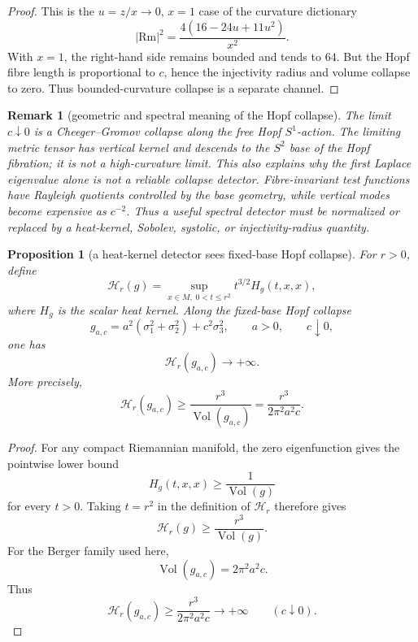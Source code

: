\documentclass[11pt]{amsart}
\newtheorem{proposition}{Proposition}
\newtheorem{remark}{Remark}
\newcommand{\Rm}{\mathrm{Rm}}
\newcommand{\Vol}{\operatorname{Vol}}
\begin{document}
\begin{proof}
This is the \(u=z/x\to0\), \(x=1\) case of the curvature dictionary
\[
        |\Rm|^2
        =
        \frac{4(16-24u+11u^2)}{x^2}.
\]
With \(x=1\), the right-hand side remains bounded and tends to \(64\).
But the Hopf fibre length is proportional to \(c\), hence the injectivity
radius and volume collapse to zero.  Thus bounded-curvature collapse is a
separate channel.
\end{proof}

\begin{remark}[geometric and spectral meaning of the Hopf collapse]\label{rem:hopf-quotient-spectrum}
The limit \(c\downarrow0\) is a Cheeger--Gromov collapse along the free Hopf
\(S^1\)-action.  The limiting metric tensor has vertical kernel and descends
to the \(S^2\) base of the Hopf fibration; it is not a high-curvature limit.
This also explains why the first Laplace eigenvalue alone is not a reliable
collapse detector.  Fibre-invariant test functions have Rayleigh quotients
controlled by the base geometry, while vertical modes become expensive as
\(c^{-2}\).  Thus a useful spectral detector must be normalized or replaced by
a heat-kernel, Sobolev, systolic, or injectivity-radius quantity.
\end{remark}


\begin{proposition}[a heat-kernel detector sees fixed-base Hopf collapse]\label{prop:heat-kernel-hopf}
For \(r>0\), define
\[
        \mathcal H_r(g)
        =
        \sup_{x\in M,\;0<t\le r^2} t^{3/2}H_g(t,x,x),
\]
where \(H_g\) is the scalar heat kernel.  Along the fixed-base Hopf collapse
\[
        g_{a,c}=a^2(\sigma_1^2+\sigma_2^2)+c^2\sigma_3^2,
        \qquad a>0,\qquad c\downarrow0,
\]
one has
\[
        \mathcal H_r(g_{a,c})\to+\infty .
\]
More precisely,
\[
        \mathcal H_r(g_{a,c})
        \ge
        \frac{r^3}{\Vol(g_{a,c})}
        =
        \frac{r^3}{2\pi^2a^2c}.
\]
\end{proposition}

\begin{proof}
For any compact Riemannian manifold, the zero eigenfunction gives the
pointwise lower bound
\[
        H_g(t,x,x)\ge \frac{1}{\Vol(g)}
\]
for every \(t>0\).  Taking \(t=r^2\) in the definition of \(\mathcal H_r\)
therefore gives
\[
        \mathcal H_r(g)\ge \frac{r^3}{\Vol(g)}.
\]
For the Berger family used here,
\[
        \Vol(g_{a,c})=2\pi^2a^2c.
\]
Thus
\[
        \mathcal H_r(g_{a,c})
        \ge
        \frac{r^3}{2\pi^2a^2c}\to+\infty
        \qquad(c\downarrow0).
\]
\end{proof}
\end{document}
